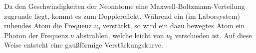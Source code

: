 Da den Geschwindigkeiten der Neonatome eine Maxwell-Boltzmann-Verteilung
zugrunde liegt, kommt es zum Dopplereffekt. Während ein (im Laborsystem)
ruhendes Atom die Frequenz $\nu_0$ verstärkt, so wird ein dazu bewegtes
Atom ein Photon der Frequenz $\nu$ abstrahlen, welche leicht von $\nu_0$
verschieden ist. Auf diese Weise entsteht eine gaußförmige Verstärkungskurve.
